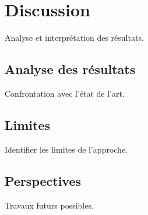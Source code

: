\chapter{Discussion}
\label{chap:discussion}

Analyse et interprétation des résultats.

\section{Analyse des résultats}
Confrontation avec l'état de l'art.

\section{Limites}
Identifier les limites de l'approche.

\section{Perspectives}
Travaux futurs possibles.